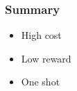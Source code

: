 \begin{frame}
\frametitle{Summary}

\begin{itemize}

\item High cost
\item Low reward
\item One shot
\end{itemize}

\end{frame}


